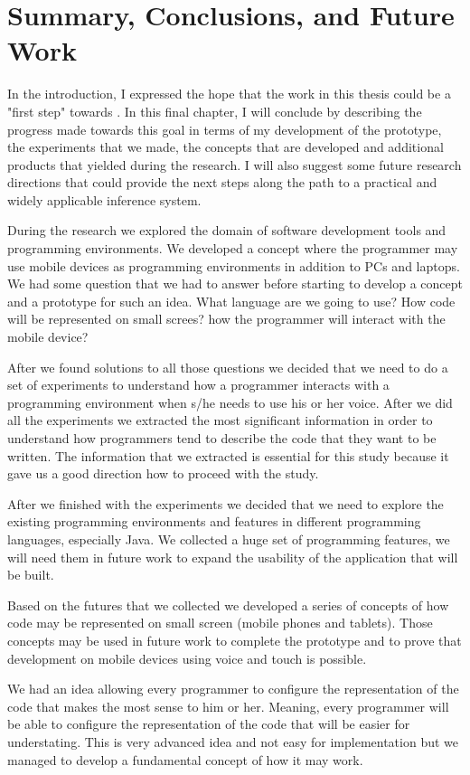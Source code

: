 \chapter{Summary, Conclusions, and Future Work}
In the introduction, I expressed the hope that the work in this thesis could be a "first step" towards . In this final chapter, I will conclude by describing the progress made towards this goal in terms of my development of the prototype, the experiments that we made, the concepts that are developed and additional products that yielded during the research. I will also suggest some future research directions that could provide the next steps along the path to a practical and widely applicable inference system.

During the research we explored the domain of software development tools and programming environments. We developed a concept where the programmer may use mobile devices as programming environments in addition to PCs and laptops. We had some question that we had to answer before starting to develop a concept and a prototype for such an idea. What language are we going to use? How code will be represented on small screes? how the programmer will interact with the mobile device?

After we found solutions to all those questions we decided that we need to do a set of experiments to understand how a programmer interacts with a programming environment when s/he needs to use his or her voice. After we did all the experiments we extracted the most significant information in order to understand how programmers tend to describe the code that they want to be written. The information that we extracted is essential for this study because it gave us a good direction how to proceed with the study. 

After we finished with the experiments we decided that we need to explore the existing programming environments and features in different programming languages, especially Java. We collected a huge set of programming features, we will need them in future work to expand the usability of the application that will be built.

Based on the futures that we collected we developed a series of concepts of how code may be represented on small screen (mobile phones and tablets). Those concepts may be used in future work to complete the prototype and to prove that development on mobile devices using voice and touch is possible.

We had an idea allowing every programmer to configure the representation of the code that makes the most sense to him or her. Meaning, every programmer will be able to configure the representation of the code that will be easier for understating. This is very advanced idea and not easy for implementation but we managed to develop a fundamental concept of how it may work.

